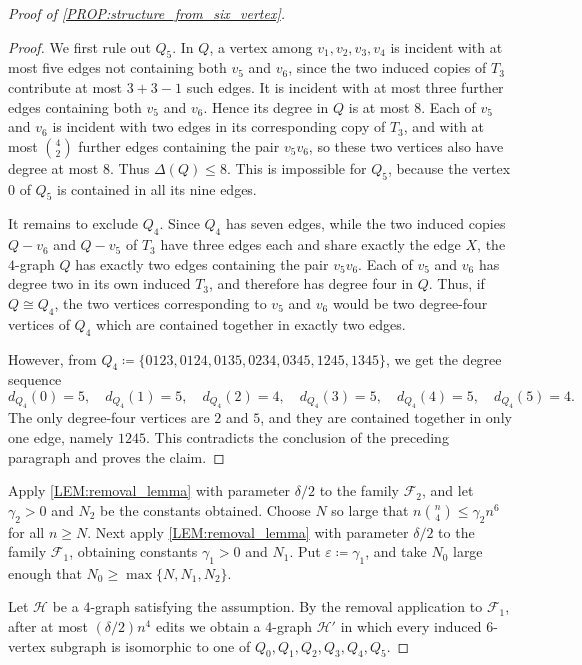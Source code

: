 \documentclass[10pt,a4paper]{article}
\theoremstyle{plain}
\theoremstyle{definition}
\begin{document}
\begin{proof}[Proof of \cref{PROP:structure_from_six_vertex}]
\begin{proof}
We first rule out $Q_5$.  In $Q$, a vertex among $v_1,v_2,v_3,v_4$ is incident with at most five edges not containing both $v_5$ and $v_6$, since the two induced copies of $T_3$ contribute at most $3+3-1$ such edges.  It is incident with at most three further edges containing both $v_5$ and $v_6$.  Hence its degree in $Q$ is at most $8$.  Each of $v_5$ and $v_6$ is incident with two edges in its corresponding copy of $T_3$, and with at most $\binom42$ further edges containing the pair $v_5v_6$, so these two vertices also have degree at most $8$.  Thus $\Delta(Q)\le 8$.  This is impossible for $Q_5$, because the vertex $0$ of $Q_5$ is contained in all its nine edges.

It remains to exclude $Q_4$.  Since $Q_4$ has seven edges, while the two induced copies $Q-v_6$ and $Q-v_5$ of $T_3$ have three edges each and share exactly the edge $X$, the $4$-graph $Q$ has exactly two edges containing the pair $v_5v_6$.  Each of $v_5$ and $v_6$ has degree two in its own induced $T_3$, and therefore has degree four in $Q$.  Thus, if $Q\cong Q_4$, the two vertices corresponding to $v_5$ and $v_6$ would be two degree-four vertices of $Q_4$ which are contained together in exactly two edges.

However, from $Q_4\coloneqq\{0123,0124,0135,0234,0345,1245,1345\}$, we get the degree sequence
\[
d_{Q_4}(0)=5,
\quad d_{Q_4}(1)=5,
\quad d_{Q_4}(2)=4,
\quad d_{Q_4}(3)=5,
\quad d_{Q_4}(4)=5,
\quad d_{Q_4}(5)=4.
\]
The only degree-four vertices are $2$ and $5$, and they are contained together in only one edge, namely $1245$.  This contradicts the conclusion of the preceding paragraph and proves the claim.
\end{proof}

Apply \cref{LEM:removal_lemma} with parameter $\delta/2$ to the family $\mathcal F_2$, and let $\gamma_2>0$ and $N_2$ be the constants obtained.  Choose $N$ so large that $n\binom n4\le \gamma_2n^6$ for all $n\ge N$.  Next apply \cref{LEM:removal_lemma} with parameter $\delta/2$ to the family $\mathcal F_1$, obtaining constants $\gamma_1>0$ and $N_1$.  Put $\varepsilon\coloneqq\gamma_1$, and take $N_0$ large enough that $N_0\ge \max\{N,N_1,N_2\}$.

Let $\mathcal H$ be a $4$-graph satisfying the assumption.  By the removal application to $\mathcal F_1$, after at most $(\delta/2)n^4$ edits we obtain a $4$-graph $\mathcal H'$ in which every induced $6$-vertex subgraph is isomorphic to one of $Q_0,Q_1,Q_2,Q_3,Q_4,Q_5$.


\end{proof}
\end{document}

